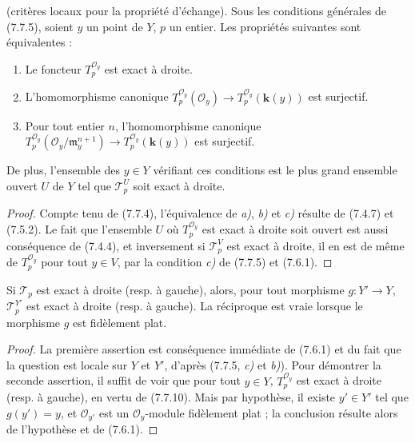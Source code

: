 \begin{proposition}[7.7.10]
\textnormal{(critères locaux pour la propriété d'échange).} Sous les conditions
générales de \textup{(7.7.5)}, soient $y$ un point de $Y$, $p$ un entier. Les propriétés
suivantes sont équivalentes :
\begin{enumerate}
  \item[\textup{a)}] Le foncteur $T_p^{\mathscr O_y}$ est exact à droite.

  \item[\textup{b)}] L'homomorphisme canonique
    $      T_p^{\mathscr O_y}(\mathscr O_y)
      \longrightarrow
      T_p^{\mathscr O_y}(\boldsymbol{k}(y))$
    est surjectif.

  \item[\textup{c)}] Pour tout entier $n$, l'homomorphisme canonique
    $      T_p^{\mathscr O_y}
      (\mathscr O_y/\mathfrak m_y^{n+1})
      \longrightarrow
      T_p^{\mathscr O_y}(\boldsymbol{k}(y))$
    est surjectif.
\end{enumerate}

De plus, l'ensemble des $y\in Y$ vérifiant ces conditions est le plus grand
ensemble ouvert $U$ de $Y$ tel que $\mathscr T_p^U$ soit exact à droite.
\end{proposition}

\begin{proof}
Compte tenu de (7.7.4), l'équivalence de \emph{a)}, \emph{b)} et \emph{c)} résulte de (7.4.7) et
(7.5.2). Le fait que l'ensemble $U$ où $T_p^{\mathscr O_y}$ est exact à droite
soit ouvert est aussi conséquence de (7.4.4), et inversement si
$\mathscr T_p^V$ est exact à droite, il en est de même de
$T_p^{\mathscr O_y}$ pour tout $y\in V$, par la condition \emph{c)} de (7.7.5) et
(7.6.1).
\end{proof}

\begin{corollary}[7.7.11]
Si $\mathscr T_p$ est exact à droite \textup{(resp.} à gauche\textup{)}, alors, pour tout morphisme
$g:Y'\to Y$, $\mathscr T_p^{Y'}$ est exact à droite \textup{(resp.} à gauche\textup{)}. La
réciproque est vraie lorsque le morphisme $g$ est fidèlement plat.
\end{corollary}

\begin{proof}
La première assertion est conséquence immédiate de (7.6.1) et du fait que la
question est locale sur $Y$ et $Y'$, d'après (7.7.5, \emph{c)} et \emph{b)}). Pour démontrer
la seconde assertion, il suffit de voir que pour tout $y\in Y$,
$T_p^{\mathscr O_y}$ est exact à droite (resp. à gauche), en vertu de (7.7.10).
Mais par hypothèse, il existe $y'\in Y'$ tel que $g(y')=y$, et
$\mathscr O_{y'}$ est un $\mathscr O_y$-module fidèlement plat ; la conclusion
résulte alors de l'hypothèse et de (7.6.1).
\end{proof}

